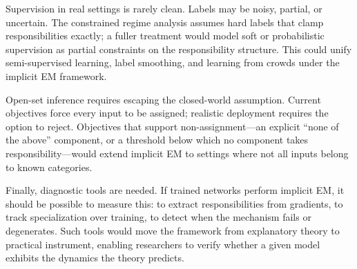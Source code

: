 Supervision in real settings is rarely clean. Labels may be noisy, partial, or uncertain. The constrained regime analysis assumes hard labels that clamp responsibilities exactly; a fuller treatment would model soft or probabilistic supervision as partial constraints on the responsibility structure. This could unify semi-supervised learning, label smoothing, and learning from crowds under the implicit EM framework.

Open-set inference requires escaping the closed-world assumption. Current objectives force every input to be assigned; realistic deployment requires the option to reject. Objectives that support non-assignment---an explicit ``none of the above'' component, or a threshold below which no component takes responsibility---would extend implicit EM to settings where not all inputs belong to known categories.

Finally, diagnostic tools are needed. If trained networks perform implicit EM, it should be possible to measure this: to extract responsibilities from gradients, to track specialization over training, to detect when the mechanism fails or degenerates. Such tools would move the framework from explanatory theory to practical instrument, enabling researchers to verify whether a given model exhibits the dynamics the theory predicts.
